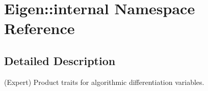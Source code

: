 \hypertarget{namespaceEigen_1_1internal}{}\section{Eigen\+:\+:internal Namespace Reference}
\label{namespaceEigen_1_1internal}


\subsection{Detailed Description}
(Expert) Product traits for algorithmic differentiation variables. 